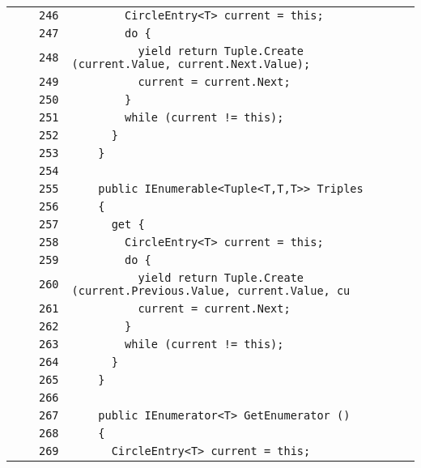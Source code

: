 \documentclass[a4paper,10pt]{article}
\begin{document}
\begin{longtable}[l]{lrrl}
\cellcolor{gray} &  & \verb~246~ & \verb~        CircleEntry<T> current = this;~\\
\cellcolor{gray} &  & \verb~247~ & \verb~        do {~\\
\cellcolor{gray} &  & \verb~248~ & \verb~          yield return Tuple.Create (current.Value, current.Next.Value);~\\
\cellcolor{gray} &  & \verb~249~ & \verb~          current = current.Next;~\\
\cellcolor{gray} &  & \verb~250~ & \verb~        }~\\
\cellcolor{gray} &  & \verb~251~ & \verb~        while (current != this);~\\
\cellcolor{gray} &  & \verb~252~ & \verb~      }~\\
\cellcolor{gray} &  & \verb~253~ & \verb~    }~\\
\cellcolor{gray} &  & \verb~254~ & \verb~~\\
\cellcolor{gray} &  & \verb~255~ & \verb~    public IEnumerable<Tuple<T,T,T>> Triples~\\
\cellcolor{gray} &  & \verb~256~ & \verb~    {~\\
\cellcolor{gray} &  & \verb~257~ & \verb~      get {~\\
\cellcolor{gray} &  & \verb~258~ & \verb~        CircleEntry<T> current = this;~\\
\cellcolor{gray} &  & \verb~259~ & \verb~        do {~\\
\cellcolor{gray} &  & \verb~260~ & \verb~          yield return Tuple.Create (current.Previous.Value, current.Value, cu~\\
\cellcolor{gray} &  & \verb~261~ & \verb~          current = current.Next;~\\
\cellcolor{gray} &  & \verb~262~ & \verb~        }~\\
\cellcolor{gray} &  & \verb~263~ & \verb~        while (current != this);~\\
\cellcolor{gray} &  & \verb~264~ & \verb~      }~\\
\cellcolor{gray} &  & \verb~265~ & \verb~    }~\\
\cellcolor{gray} &  & \verb~266~ & \verb~~\\
\cellcolor{gray} &  & \verb~267~ & \verb~    public IEnumerator<T> GetEnumerator ()~\\
\cellcolor{gray} &  & \verb~268~ & \verb~    {~\\
\cellcolor{gray} &  & \verb~269~ & \verb~      CircleEntry<T> current = this;~\\

\end{longtable}
\end{document}
